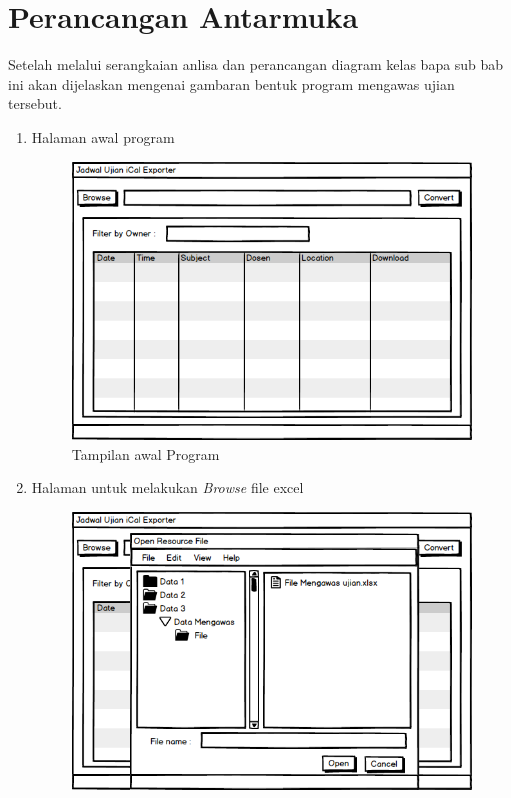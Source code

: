 \section{Perancangan Antarmuka}
Setelah melalui serangkaian anlisa dan perancangan diagram kelas bapa sub bab ini akan dijelaskan mengenai gambaran bentuk program mengawas ujian tersebut.

\begin{enumerate}
	\item Halaman awal program 
		\begin{figure}[H]
		\centering
		\includegraphics[scale=0.5]{Gambar/antarmuka}
		\caption{Tampilan awal Program}
		\label{fig:tampilan_awal}
		\end{figure}
	\item Halaman untuk melakukan \textit{Browse} file excel
		\begin{figure}[H]
		\centering
		\includegraphics[scale=0.5]{Gambar/antarmuka3}

\end{figure}
\end{enumerate}

